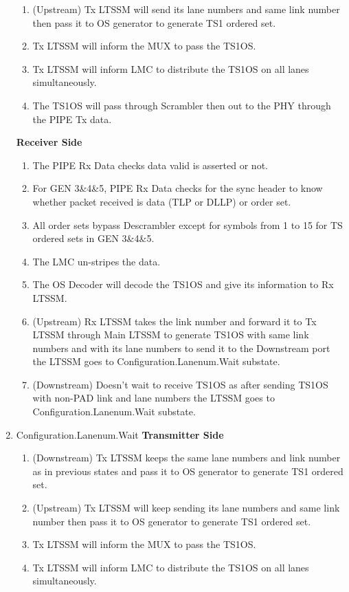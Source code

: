 \begin{enumerate}
\begin{enumerate}
  \item (Upstream) Tx LTSSM will send its lane numbers and same link number then pass it to OS generator to generate TS1 ordered set.
  \item Tx LTSSM will inform the MUX to pass the TS1OS.
  \item Tx LTSSM will inform LMC to distribute the TS1OS on all lanes simultaneously.
  \item The TS1OS will pass through Scrambler then out to the PHY through the PIPE Tx data.
\end{enumerate}
\textbf{Receiver Side}
\begin{enumerate}
  \item The PIPE Rx Data checks data valid is asserted or not.
  \item For GEN 3\&4\&5, PIPE Rx Data checks for the sync header to know whether packet received is data (TLP or DLLP) or order set.
  \item All order sets bypass Descrambler except for symbols from 1 to 15 for TS ordered sets in GEN 3\&4\&5.
  \item The LMC un-stripes the data.
  \item The OS Decoder will decode the TS1OS and give its information to Rx LTSSM.
  \item (Upstream) Rx LTSSM takes the link number and forward it to Tx LTSSM through Main LTSSM to generate TS1OS with same link numbers and with its lane numbers to send it to the Downstream port the LTSSM goes to Configuration.Lanenum.Wait substate.
  \item (Downstream) Doesn’t wait to receive TS1OS as after sending TS1OS with non-PAD link and lane numbers the LTSSM goes to Configuration.Lanenum.Wait substate.
\end{enumerate}
\item Configuration.Lanenum.Wait
\newline\textbf{Transmitter Side}
\begin{enumerate}
  \item (Downstream) Tx LTSSM keeps the same lane numbers and link number as in previous states and pass it to OS generator to generate TS1 ordered set.
  \item (Upstream) Tx LTSSM will keep sending its lane numbers and same link number then pass it to OS generator to generate TS1 ordered set.
  \item Tx LTSSM will inform the MUX to pass the TS1OS.
  \item Tx LTSSM will inform LMC to distribute the TS1OS on all lanes simultaneously.

\end{enumerate}
\end{enumerate}
